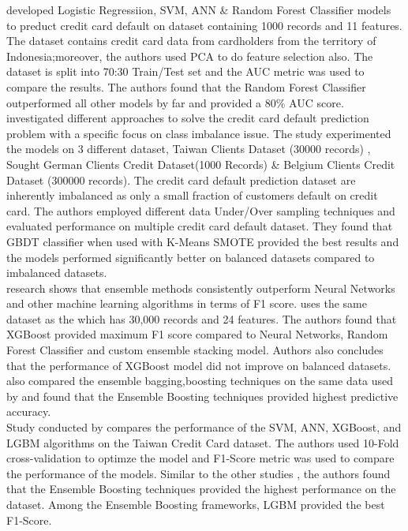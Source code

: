 \documentclass[twoside,11pt,a4paper]{article}
\begin{document}
\citep{widyadhanacredit} developed Logistic Regressiion, \acs{SVM}, \acs{ANN} \& Random Forest Classifier models to preduct credit card default on dataset containing 1000 records and 11 features. The dataset contains credit card data from cardholders from the territory of Indonesia;moreover, the authors used \acf{PCA} to do feature selection also. The dataset is split into 70:30 Train/Test set and the \acs{AUC} metric was used to compare the results. The authors found that the Random Forest Classifier outperformed all other models by far and provided a 80\% \acs{AUC} score.\\


\citep{alam2020investigation} investigated different approaches to solve the credit card default prediction problem with a specific focus on class imbalance issue. The study experimented the models on 3 different dataset, Taiwan Clients Dataset (30000 records) \citep{yeh2009comparisons}, Sought German Clients Credit Dataset(1000 Records) \& Belgium Clients Credit Dataset (300000 records).  The credit card default prediction dataset are inherently imbalanced as only a small fraction of customers default on credit card. The authors employed different data Under/Over sampling techniques and evaluated performance on multiple credit card default dataset. They found that \acs{GBDT} classifier when used with K-Means \acs{SMOTE} provided the best results and the models performed significantly better on balanced datasets compared to imbalanced datasets.\\

\citep{faraj2021comparison} research shows that ensemble  methods  consistently  outperform  Neural  Networks  and  other  machine  learning algorithms in terms of F1 score. \citep{faraj2021comparison} uses the same dataset as the \citep{sayjadah2018credit} which has 30,000 records and 24 features. The authors found that \acs{XGBoost} provided maximum F1 score compared to Neural Networks, Random Forest Classifier and custom ensemble stacking model. Authors also concludes that the performance of \acs{XGBoost} model did not improve on balanced datasets. \citep{emil2019enhancing} also compared the ensemble bagging,boosting techniques on the same data used by \citep{faraj2021comparison} and found that 
the Ensemble Boosting techniques provided highest predictive accuracy.  \\

Study conducted by \cite{yang2018comparison} compares the performance of the \acs{SVM}, \acs{ANN}, \acs{XGBoost}, and \acs{LGBM} algorithms on the Taiwan Credit Card dataset. The authors used 10-Fold cross-validation to optimze the model and  F1-Score metric was used to compare the performance of the models. Similar to the other studies \citep{faraj2021comparison} \citep{emil2019enhancing}, the authors found that the Ensemble Boosting techniques provided the highest performance on the dataset. Among the Ensemble Boosting frameworks, \acs{LGBM} provided the best F1-Score.\\
\end{document}
